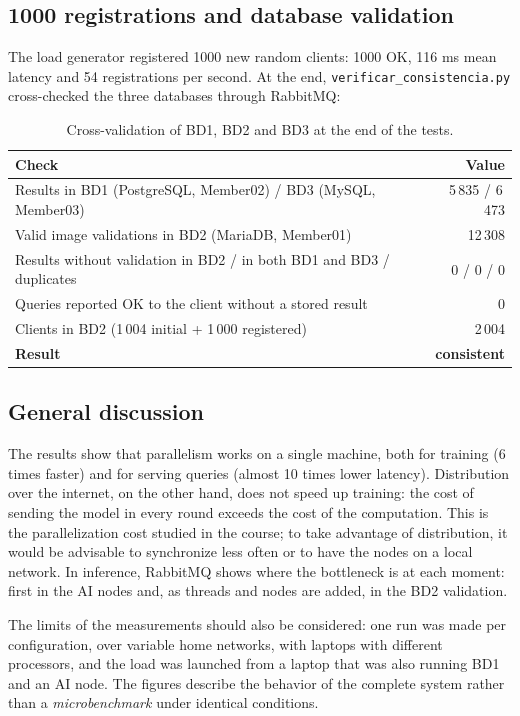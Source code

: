 \documentclass[10pt,a4paper]{article}
\begin{document}
\subsection{1000 registrations and database validation}

The load generator registered 1000 new random clients: 1000 OK, 116 ms mean latency and 54
registrations per second. At the end, \texttt{verificar\_consistencia.py} cross-checked the three
databases through RabbitMQ:

\begin{table}[H]
\centering
\small
\begin{tabularx}{\textwidth}{Yr}
\toprule
\textbf{Check} & \textbf{Value} \\
\midrule
Results in BD1 (PostgreSQL, Member02) / BD3 (MySQL, Member03) & 5\,835 / 6\,473 \\
Valid image validations in BD2 (MariaDB, Member01) & 12\,308 \\
Results without validation in BD2 / in both BD1 and BD3 / duplicates & 0 / 0 / 0 \\
Queries reported OK to the client without a stored result & 0 \\
Clients in BD2 (1\,004 initial + 1\,000 registered) & 2\,004 \\
\midrule
\textbf{Result} & \textbf{consistent} \\
\bottomrule
\end{tabularx}
\caption{Cross-validation of BD1, BD2 and BD3 at the end of the tests.}
\label{tab:consistencia}
\end{table}

\subsection{General discussion}

The results show that parallelism works on a single machine, both for training (6 times faster) and
for serving queries (almost 10 times lower latency). Distribution over the internet, on the other hand,
does not speed up training: the cost of sending the model in every round exceeds the cost of the
computation. This is the parallelization cost studied in the course; to take advantage of distribution,
it would be advisable to synchronize less often or to have the nodes on a local network. In inference,
RabbitMQ shows where the bottleneck is at each moment: first in the AI nodes and, as threads and nodes
are added, in the BD2 validation.

The limits of the measurements should also be considered: one run was made per configuration, over
variable home networks, with laptops with different processors, and the load was launched from a laptop
that was also running BD1 and an AI node. The figures describe the behavior of the complete system
rather than a \textit{microbenchmark} under identical conditions.
\end{document}
